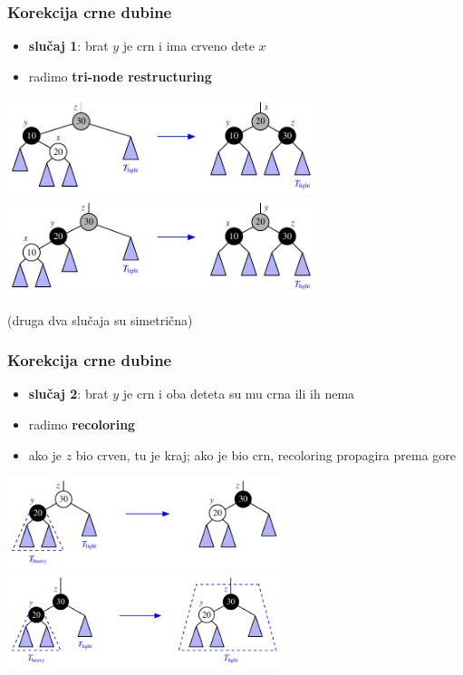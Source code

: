\documentclass[compress]{beamer}
\begin{document}
\begin{frame}[fragile]
  \frametitle{Korekcija crne dubine}
  \begin{itemize}
    \item \textbf{slučaj 1}: brat $y$ je crn i ima crveno dete $x$
    \item radimo \textbf{tri-node restructuring}
  \end{itemize}
  \begin{center}
    \includegraphics[width=9cm]{asp-11-pic42a.pdf} \\
    \includegraphics[width=9cm]{asp-11-pic42b.pdf} \\
  \end{center}
  {\scriptsize (druga dva slučaja su simetrična)}
\end{frame}

\begin{frame}[fragile]
  \frametitle{Korekcija crne dubine}
  \begin{itemize}
    \item \textbf{slučaj 2}: brat $y$ je crn i oba deteta su mu crna ili ih nema
    \item radimo \textbf{recoloring}
    \item ako je $z$ bio crven, tu je kraj; ako je bio crn, recoloring propagira prema gore
  \end{itemize}
  \begin{center}
    \includegraphics[width=8cm]{asp-11-pic43a.pdf} \\
    \includegraphics[width=8cm]{asp-11-pic43b.pdf} \\
  \end{center}
\end{frame}
\end{document}
